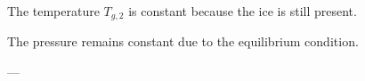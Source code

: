 The temperature \( T_{g,2} \) is constant because the ice is still present.  

The pressure remains constant due to the equilibrium condition.  

---